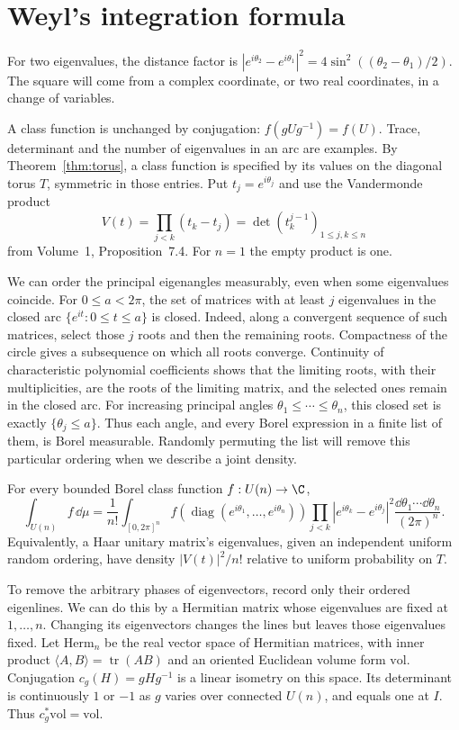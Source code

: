 \section{Weyl's integration formula}

For two eigenvalues, the distance factor is
$|e^{i\theta_2}-e^{i\theta_1}|^2=4\sin^2((\theta_2-\theta_1)/2)$.
The square will come from a complex coordinate, or two real coordinates,
in a change of variables.

A class function is unchanged by conjugation:
$f(gUg^{-1})=f(U)$. Trace, determinant and the number of eigenvalues in
an arc are examples. By Theorem~\ref{thm:torus}, a class function is
specified by its values on the diagonal torus $T$, symmetric in those
entries. Put $t_j=e^{i\theta_j}$ and use the Vandermonde product
\[
 V(t)=\prod_{j<k}(t_k-t_j)=\det(t_k^{j-1})_{1\le j,k\le n}
\]
from Volume~1, Proposition~7.4. For $n=1$ the empty product is one.

We can order the principal eigenangles measurably, even when some eigenvalues
coincide. For $0\le a<2\pi$, the set of matrices with at least $j$
eigenvalues in the closed arc $\{e^{it}:0\le t\le a\}$ is closed.
Indeed, along a convergent sequence of such matrices, select those $j$
roots and then the remaining roots. Compactness of the circle gives a
subsequence on which all roots converge. Continuity of characteristic
polynomial coefficients shows that the limiting roots, with their
multiplicities, are the roots of the limiting matrix, and the selected
ones remain in the closed arc. For increasing principal angles
$\theta_1\le\cdots\le\theta_n$, this closed set is exactly
$\{\theta_j\le a\}$. Thus each angle, and every Borel expression in a
finite list of them, is Borel measurable. Randomly permuting the list
will remove this particular ordering when we describe a joint density.

\begin{theorem}[Weyl, 1925]\label{thm:weyl}
For every bounded Borel class function $f:U(n)\to\C$,
\[
 \int_{U(n)}f\,\dd\mu
 =\frac1{n!}\int_{[0,2\pi]^n}
 f(\operatorname{diag}(e^{i\theta_1},\ldots,e^{i\theta_n}))
 \prod_{j<k}|e^{i\theta_k}-e^{i\theta_j}|^2
 \frac{\dd\theta_1\cdots\dd\theta_n}{(2\pi)^n}.
\]
Equivalently, a Haar unitary matrix's eigenvalues, given an independent
uniform random ordering, have density $|V(t)|^2/n!$ relative to uniform
probability on $T$.
\end{theorem}

To remove the arbitrary phases of eigenvectors, record only their ordered
eigenlines. We can do this by a Hermitian matrix whose eigenvalues are
fixed at $1,\ldots,n$. Changing its eigenvectors changes the lines but
leaves those eigenvalues fixed.
Let $\mathrm{Herm}_n$ be the real vector space of Hermitian matrices,
with inner product $\langle A,B\rangle=\operatorname{tr}(AB)$ and an
oriented Euclidean volume form $\mathrm{vol}$.
Conjugation $c_g(H)=gHg^{-1}$ is a linear isometry on this space.
Its determinant is continuously $1$ or $-1$ as $g$ varies over connected
$U(n)$, and equals one at $I$. Thus $c_g^*\mathrm{vol}=\mathrm{vol}$.

